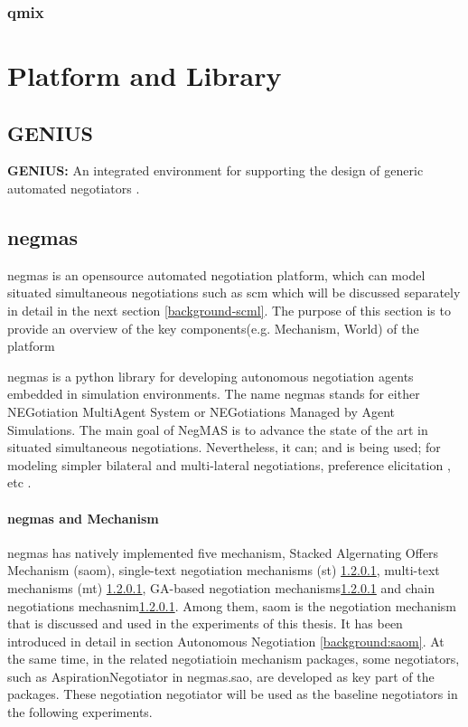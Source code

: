 \subsubsection{\gls{qmix}}

\section{Platform and Library}
\subsection{GENIUS}
\textbf{GENIUS:} An integrated environment for supporting the design of generic automated negotiators \parencite{Lin2014}.

\subsection{\gls{negmas}} \label{background:negmas}
\gls{negmas} is an opensource automated negotiation platform, which can model situated simultaneous negotiations such as \gls{scm} which will be discussed separately in detail in the next section \ref{background-scml}. The purpose of this section is to provide an overview of the key components(e.g. Mechanism, World) of the platform

\gls{negmas} is a python library for developing autonomous negotiation agents embedded in simulation environments. The name negmas stands for either NEGotiation MultiAgent System or NEGotiations Managed by Agent Simulations. The main goal of NegMAS is to advance the state of the art in situated simultaneous negotiations. Nevertheless, it can; and is being used; for modeling simpler bilateral and multi-lateral negotiations, preference elicitation , etc \parencite{Mohammad2019}.

\paragraph{\gls{negmas} and Mechanism}
\gls{negmas} has natively implemented five mechanism, Stacked Algernating Offers Mechanism (\gls{saom}), single-text negotiation mechanisms (st) \ref{}, multi-text mechanisms (mt) \ref{}, GA-based negotiation mechanisms\ref{} and chain negotiations mechasnim\ref{}. Among them, \gls{saom} is the negotiation mechanism that is discussed and used in the experiments of this thesis. It has been introduced in detail in section Autonomous Negotiation \ref{background:saom}. At the same time, in the related negotiatioin mechanism packages, some negotiators, such as AspirationNegotiator in negmas.sao, are developed as key part of the packages. These negotiation negotiator will be used as the baseline negotiators in the following experiments.
